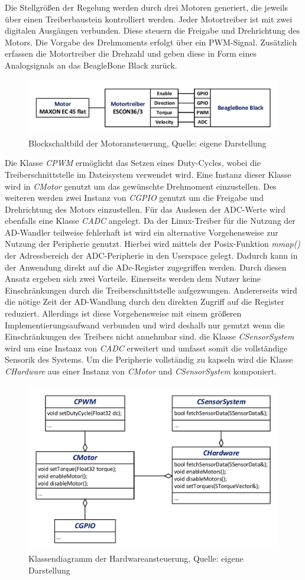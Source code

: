Die Stellgrößen der Regelung werden durch drei Motoren generiert, die jeweils über einen Treiberbaustein kontrolliert werden. Jeder Motortreiber ist mit zwei digitalen Ausgängen verbunden. Diese steuern die Freigabe und Drehrichtung des Motors. Die Vorgabe des Drehmoments erfolgt über ein PWM-Signal. Zusätzlich erfassen die Motortreiber die Drehzahl und geben diese in Form eines Analogsignals an das BeagleBone Black zurück.
\begin{figure}[!h]
\centering
\includegraphics[width=0.7\linewidth]{img/SW_0_Motoren_BSB.pdf}
\caption{Blockschaltbild der Motoransteuerung, Quelle: eigene Darstellung} 
\end{figure}
Die Klasse \textit{CPWM} ermöglicht das Setzen eines Duty-Cycles, wobei die Treiberschnittstelle im Dateisystem verwendet wird. Eine Instanz dieser Klasse wird in \textit{CMotor} genutzt um das gewünschte Drehmoment einzustellen. Des weiteren werden zwei Instanz von \textit{CGPIO} genutzt um die Freigabe und Drehrichtung des Motors einzustellen. Für das Auslesen der ADC-Werte wird ebenfalls eine Klasse \textit{CADC} angelegt. Da der Linux-Treiber für die Nutzung der AD-Wandler teilweise fehlerhaft ist wird ein alternative Vorgehensweise zur Nutzung der Peripherie genutzt. Hierbei wird mittels der Posix-Funktion \textit{mmap()} der Adressbereich der ADC-Peripherie in den Userspace gelegt. Dadurch kann in der Anwendung direkt auf die ADc-Register zugegriffen werden. Durch diesen Ansatz ergeben sich zwei Vorteile. Einerseits werden dem Nutzer keine Einschränkungen durch die Treiberschnittstelle aufgezwungen. Andererseits wird die nötige Zeit der AD-Wandlung durch den direkten Zugriff auf die Register reduziert. Allerdings ist diese Vorgehensweise mit einem größeren Implementierungsaufwand verbunden und wird deshalb nur genutzt wenn die Einschränkungen des Treibers nicht annehmbar sind.
die Klasse \textit{CSensorSystem} wird um eine Instanz von \textit{CADC} erweitert und umfasst somit die vollständige Sensorik des Systems. Um die Peripherie vollständig zu kapseln wird die Klasse \textit{CHardware} aus einer Instanz von \textit{CMotor} und \textit{CSensorSystem} komponiert.
\begin{figure}[!h]
\centering
\includegraphics[width=0.7\linewidth]{img/SW_0_Hardware_KD.pdf}
\caption{Klassendiagramm der Hardwareansteuerung, Quelle: eigene Darstellung}
\end{figure}